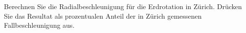 Berechnen Sie die Radialbeschleunigung für die Erdrotation in Zürich. Drücken Sie das Resultat als prozentualen Anteil der in Zürich gemessenen Fallbeschleunigung aus.
